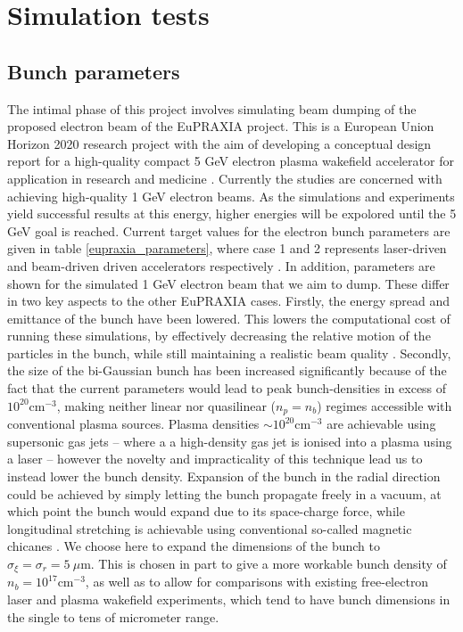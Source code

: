 \chapter{Simulation tests} %
\section{Bunch parameters}
The intimal phase of this project involves simulating beam dumping of the proposed electron beam of the EuPRAXIA project. This is a European Union Horizon 2020 research project with the aim of developing a conceptual design report for a high-quality compact 5 GeV electron plasma wakefield accelerator for application in research and medicine \cite{Eupraxia}. Currently the studies are concerned with achieving high-quality 1 GeV electron beams. As the simulations and experiments yield successful results at this energy, higher energies will be expolored until the 5 GeV goal is reached. Current target values for the electron bunch parameters are given in table \ref{eupraxia_parameters}, where case 1 and 2 represents laser-driven and beam-driven driven accelerators respectively \cite{Eupraxia}.  In addition, parameters are shown for the simulated 1 GeV electron beam that we aim to dump. These differ in two key aspects to the other EuPRAXIA cases. Firstly, the energy spread and emittance of the bunch have been lowered. This lowers the computational cost of running these simulations, by effectively decreasing the relative motion of the particles in the bunch, while still maintaining a realistic beam quality \cite{Walker2017}. Secondly, the size of the bi-Gaussian bunch has been increased significantly because of the fact that the current parameters would lead to peak bunch-densities in excess of $10^{20} \text{cm}^{-3}$, making neither linear nor quasilinear ($n_p=n_b$) regimes accessible with conventional plasma sources. Plasma densities $\sim 10^{20} \text{cm}^{-3}$ are achievable using supersonic gas jets \cite{Schmid2012} -- where a a high-density gas jet is ionised into a plasma using a laser -- however the novelty and impracticality of this technique lead us to instead lower the bunch density. Expansion of the bunch in the radial direction could be achieved by simply letting the bunch propagate freely in a vacuum, at which point the bunch would expand due to its space-charge force, while longitudinal stretching is achievable using conventional so-called magnetic chicanes \cite{Maier2012}. We choose here to expand the dimensions of the bunch to $\sigma_{\xi}=\sigma_r=5~\mu\text{m}$. This is chosen in part to give a more workable bunch density of $n_b=10^{17} \text{cm}^{-3}$, as well as to allow for comparisons with existing free-electron laser and plasma wakefield experiments, which tend to have bunch dimensions in the single to tens of micrometer range. \vspace{-10pt}\\
